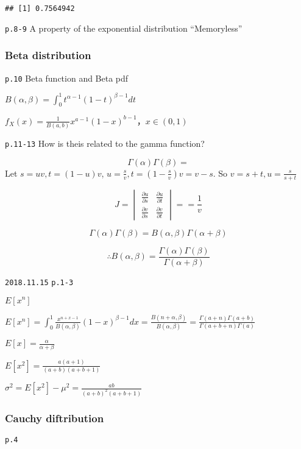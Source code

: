 \documentclass[]{tufte-book}
\begin{document}
\begin{verbatim}
## [1] 0.7564942
\end{verbatim}

\texttt{p.8-9} A property of the exponential distribution ``Memoryless''

\hypertarget{beta-distribution}{%
\subsubsection{Beta distribution}\label{beta-distribution}}

\texttt{p.10} Beta function and Beta pdf

\(B(\alpha,\beta)=\int_0^1 t^{\alpha-1}(1-t)^{\beta-1}dt\)

\(f_X(x)=\frac{1}{B(a,b)}x^{a-1}(1-x)^{b-1}， x\in(0,1)\)

\texttt{p.11-13} How is theis related to the gamma function?

\[\Gamma(\alpha)\Gamma(\beta)=\] Let \(s=uv,t=(1-u)v\),
\(u=\frac{s}v, t=(1-\frac{s}v)v=v-s\). So \(v=s+t, u=\frac{s}{s+t}\)

\[J=\begin{vmatrix}\frac{\partial u}{\partial s} & \frac{\partial u}{\partial t} \\ \frac{\partial v}{\partial s} & \frac{\partial v}{\partial t} \end{vmatrix}= =\frac1v\]

\[\Gamma(\alpha)\Gamma(\beta)=B(\alpha,\beta)\Gamma(\alpha+\beta)\]

\[\therefore B(\alpha,\beta)=\frac{\Gamma(\alpha)\Gamma(\beta)}{\Gamma(\alpha+\beta)}\]

\texttt{2018.11.15} \texttt{p.1-3}

\(E[x^n]\)

\(E[x^n]=\int_0^1\frac{x^{n+x-1}}{B(\alpha,\beta)}(1-x)^{\beta-1}dx=\frac{B(n+\alpha,\beta)}{B(\alpha,\beta)}=\frac{\Gamma(a+n)\Gamma(a+b)}{\Gamma(a+b+n)\Gamma(a)}\)

\(E[x]=\frac{\alpha}{\alpha+\beta}\)

\(E[x^2]=\frac{a(a+1)}{(a+b)(a+b+1)}\)

\(\sigma^2=E[x^2]-\mu^2=\frac{ab}{(a+b)^2(a+b+1)}\)

\hypertarget{cauchy-diftribution}{%
\subsubsection{Cauchy diftribution}\label{cauchy-diftribution}}

\texttt{p.4}
\end{document}
